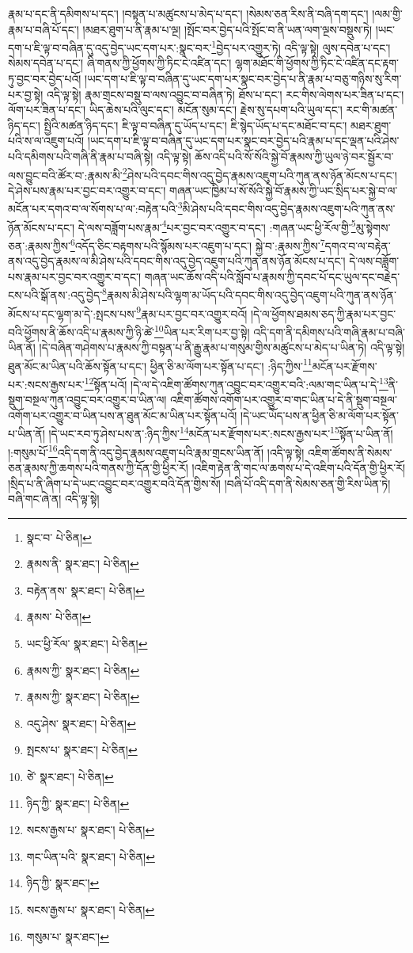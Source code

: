 རྣམ་པ་དང་ནི་དམིགས་པ་དང་། །བསྟན་པ་མཚུངས་པ་མེད་པ་དང་། །སེམས་ཅན་རིས་ནི་བཞི་དག་དང་། །ལམ་གྱི་རྣམ་པ་བཞི་པོ་དང་། །མཐར་ཐུག་པ་ནི་རྣམ་པ་ལྔ། །སྤོང་བར་བྱེད་པའི་སྤོང་བ་ནི་ཡན་ལག་ལྔས་བསྡུས་ཏེ། །ཡང་དག་པ་ཇི་ལྟ་བ་བཞིན་དུ་འདུ་བྱེད་ཡང་དག་པར་:སྣང་བར་\footnote{སྣང་བ་  པེ་ཅིན། }བྱེད་པར་འགྱུར་ཏེ། འདི་ལྟ་སྟེ། ལུས་དབེན་པ་དང་། སེམས་དབེན་པ་དང་། ཞི་གནས་ཀྱི་ཕྱོགས་ཀྱི་ཏིང་ངེ་འཛིན་དང་། ལྷག་མཐོང་གི་ཕྱོགས་ཀྱི་ཏིང་ངེ་འཛིན་དང་རྟག་ཏུ་བྱང་བར་བྱེད་པའོ། །ཡང་དག་པ་ཇི་ལྟ་བ་བཞིན་དུ་ཡང་དག་པར་སྣང་བར་བྱེད་པ་ནི་རྣམ་པ་བཅུ་གཉིས་སུ་རིག་པར་བྱ་སྟེ། འདི་ལྟ་སྟེ། རྣམ་གྲངས་བསྡུ་བ་ལས་འབྱུང་བ་བཞིན་ཏེ། ཐོས་པ་དང་། རང་གིས་ལེགས་པར་ཟིན་པ་དང་། ལོག་པར་ཟིན་པ་དང་། ཡིད་ཆེས་པའི་ལུང་དང་། མངོན་སུམ་དང་། རྗེས་སུ་དཔག་པའི་ཡུལ་དང་། རང་གི་མཚན་ཉིད་དང་། སྤྱིའི་མཚན་ཉིད་དང་། ཇི་ལྟ་བ་བཞིན་དུ་ཡོད་པ་དང་། ཇི་སྙེད་ཡོད་པ་དང་མཐོང་བ་དང་། མཐར་ཐུག་པའི་ས་ལ་འཇུག་པའོ། །ཡང་དག་པ་ཇི་ལྟ་བ་བཞིན་དུ་ཡང་དག་པར་སྣང་བར་བྱེད་པའི་རྣམ་པ་དང་ལྡན་པའི་ཤེས་པའི་དམིགས་པའི་གཞི་ནི་རྣམ་པ་བཞི་སྟེ། འདི་ལྟ་སྟེ། ཆོས་འདི་པའི་སོ་སོའི་སྐྱེ་བོ་རྣམས་ཀྱི་ཡུལ་ཉེ་བར་སྦྱོར་བ་ལས་བྱུང་བའི་ཚོར་བ་:རྣམས་མི་\footnote{རྣམས་ནི་  སྣར་ཐང་།  པེ་ཅིན། }ཤེས་པའི་དབང་གིས་འདུ་བྱེད་རྣམས་འཇུག་པའི་ཀུན་ནས་ཉོན་མོངས་པ་དང་། དེ་ཤེས་པས་རྣམ་པར་བྱང་བར་འགྱུར་བ་དང་། གཞན་ཡང་ཁྱིམ་པ་སོ་སོའི་སྐྱེ་བོ་རྣམས་ཀྱི་ཡང་སྲིད་པར་སྐྱེ་བ་ལ་མངོན་པར་དགའ་བ་ལ་སོགས་པ་ལ་:བརྟེན་པའི་\footnote{བརྟེན་ནས་  སྣར་ཐང་།  པེ་ཅིན། }མི་ཤེས་པའི་དབང་གིས་འདུ་བྱེད་རྣམས་འཇུག་པའི་ཀུན་ནས་ཉོན་མོངས་པ་དང་། དེ་ལས་བཟློག་པས་རྣམ་\footnote{རྣམས་  པེ་ཅིན། }པར་བྱང་བར་འགྱུར་བ་དང་། :གཞན་ཡང་ཕྱི་རོལ་གྱི་\footnote{ཡང་ཕྱི་རོལ་  སྣར་ཐང་།  པེ་ཅིན། }མུ་སྟེགས་ཅན་:རྣམས་ཀྱིས་\footnote{རྣམས་ཀྱི་  སྣར་ཐང་།  པེ་ཅིན། }འདོད་ཅིང་བརྟགས་པའི་སྙོམས་པར་འཇུག་པ་དང་། སྐྱེ་བ་:རྣམས་ཀྱིས་\footnote{རྣམས་ཀྱི་  སྣར་ཐང་།  པེ་ཅིན། }དགའ་བ་ལ་བརྟེན་ནས་འདུ་བྱེད་རྣམས་ལ་མི་ཤེས་པའི་དབང་གིས་འདུ་བྱེད་འཇུག་པའི་ཀུན་ནས་ཉོན་མོངས་པ་དང་། དེ་ལས་བཟློག་པས་རྣམ་པར་བྱང་བར་འགྱུར་བ་དང་། གཞན་ཡང་ཆོས་འདི་པའི་སློབ་པ་རྣམས་ཀྱི་དབང་པོ་དང་ཡུལ་དང་བརྗེད་ངས་པའི་སྒོ་ནས་:འདུ་བྱེད་\footnote{འདུ་ཤེས་  སྣར་ཐང་།  པེ་ཅིན། }རྣམས་མི་ཤེས་པའི་ལྷག་མ་ཡོད་པའི་དབང་གིས་འདུ་བྱེད་འཇུག་པའི་ཀུན་ནས་ཉོན་མོངས་པ་དང་ལྷག་མ་དེ་:སྤངས་པས་\footnote{སྤངས་པ་  སྣར་ཐང་།  པེ་ཅིན། }རྣམ་པར་བྱང་བར་འགྱུར་བའོ། །དེ་ལ་ཕྱོགས་ཐམས་ཅད་ཀྱི་རྣམ་པར་བྱང་བའི་ཕྱོགས་ནི་ཆོས་འདི་པ་རྣམས་ཀྱི་ཉི་ཚེ་\footnote{ཙེ་  སྣར་ཐང་།  པེ་ཅིན། }ཡིན་པར་རིག་པར་བྱ་སྟེ། འདི་དག་ནི་དམིགས་པའི་གཞི་རྣམ་པ་བཞི་ཡིན་ནོ། །དེ་བཞིན་གཤེགས་པ་རྣམས་ཀྱི་བསྟན་པ་ནི་རྒྱུ་རྣམ་པ་གསུམ་གྱིས་མཚུངས་པ་མེད་པ་ཡིན་ཏེ། འདི་ལྟ་སྟེ། ཐུན་མོང་མ་ཡིན་པའི་ཆོས་སྟོན་པ་དང་། ཕྱིན་ཅི་མ་ལོག་པར་སྟོན་པ་དང་། :ཉིད་ཀྱིས་\footnote{ཉིད་ཀྱི་  སྣར་ཐང་།  པེ་ཅིན། }མངོན་པར་རྫོགས་པར་:སངས་རྒྱས་པར་\footnote{སངས་རྒྱས་པ་  སྣར་ཐང་།  པེ་ཅིན། }སྟོན་པའོ། །དེ་ལ་དེ་འཇིག་ཚོགས་ཀུན་འབྱུང་བར་འགྱུར་བའི་:ལམ་གང་ཡིན་པ་དེ་\footnote{གང་ཡིན་པའི་  སྣར་ཐང་།  པེ་ཅིན། }ནི་སྡུག་བསྔལ་ཀུན་འབྱུང་བར་འགྱུར་བ་ཡིན་ལ། འཇིག་ཚོགས་འགོག་པར་འགྱུར་བ་གང་ཡིན་པ་དེ་ནི་སྡུག་བསྔལ་འགོག་པར་འགྱུར་བ་ཡིན་པས་ན་ཐུན་མོང་མ་ཡིན་པར་སྟོན་པའོ། །དེ་ཡང་ཡོད་པས་ན་ཕྱིན་ཅི་མ་ལོག་པར་སྟོན་པ་ཡིན་ནོ། །དེ་ཡང་རབ་ཏུ་ཤེས་པས་ན་:ཉིད་ཀྱིས་\footnote{ཉིད་ཀྱི་  སྣར་ཐང་། }མངོན་པར་རྫོགས་པར་:སངས་རྒྱས་པར་\footnote{སངས་རྒྱས་པ་  སྣར་ཐང་།  པེ་ཅིན། }སྟོན་པ་ཡིན་ནོ། །:གསུམ་པོ་\footnote{གསུམ་པ་  སྣར་ཐང་། }འདི་དག་ནི་འདུ་བྱེད་རྣམས་འཇུག་པའི་རྣམ་གྲངས་ཡིན་ནོ། །འདི་ལྟ་སྟེ། འཇིག་ཚོགས་ནི་སེམས་ཅན་རྣམས་ཀྱི་ཆགས་པའི་གནས་ཀྱི་དོན་གྱི་ཕྱིར་རོ། །འཇིག་རྟེན་ནི་གང་ལ་ཆགས་པ་དེ་འཇིག་པའི་དོན་གྱི་ཕྱིར་རོ། །སྲིད་པ་ནི་ཞིག་པ་དེ་ཡང་འབྱུང་བར་འགྱུར་བའི་དོན་གྱིས་སོ། །བཞི་པོ་འདི་དག་ནི་སེམས་ཅན་གྱི་རིས་ཡིན་ཏེ། བཞི་གང་ཞེ་ན། འདི་ལྟ་སྟེ། 